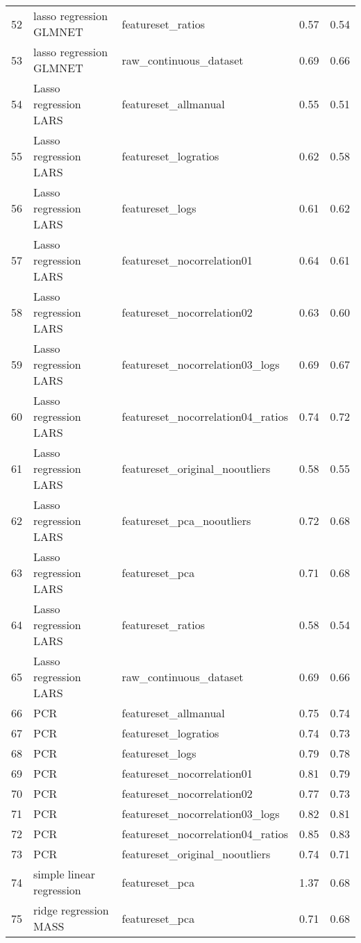 \begin{tabular}{cllcc}
  52 & lasso regression GLMNET & featureset\_ratios & 0.57 & 0.54 \\ 
  53 & lasso regression GLMNET & raw\_continuous\_dataset & 0.69 & 0.66 \\ 
  54 & Lasso regression LARS & featureset\_allmanual & 0.55 & 0.51 \\ 
  55 & Lasso regression LARS & featureset\_logratios & 0.62 & 0.58 \\ 
  56 & Lasso regression LARS & featureset\_logs & 0.61 & 0.62 \\ 
  57 & Lasso regression LARS & featureset\_nocorrelation01 & 0.64 & 0.61 \\ 
  58 & Lasso regression LARS & featureset\_nocorrelation02 & 0.63 & 0.60 \\ 
  59 & Lasso regression LARS & featureset\_nocorrelation03\_logs & 0.69 & 0.67 \\ 
  60 & Lasso regression LARS & featureset\_nocorrelation04\_ratios & 0.74 & 0.72 \\ 
  61 & Lasso regression LARS & featureset\_original\_nooutliers & 0.58 & 0.55 \\ 
  62 & Lasso regression LARS & featureset\_pca\_nooutliers & 0.72 & 0.68 \\ 
  63 & Lasso regression LARS & featureset\_pca & 0.71 & 0.68 \\ 
  64 & Lasso regression LARS & featureset\_ratios & 0.58 & 0.54 \\ 
  65 & Lasso regression LARS & raw\_continuous\_dataset & 0.69 & 0.66 \\ 
  66 & PCR & featureset\_allmanual & 0.75 & 0.74 \\ 
  67 & PCR & featureset\_logratios & 0.74 & 0.73 \\ 
  68 & PCR & featureset\_logs & 0.79 & 0.78 \\ 
  69 & PCR & featureset\_nocorrelation01 & 0.81 & 0.79 \\ 
  70 & PCR & featureset\_nocorrelation02 & 0.77 & 0.73 \\ 
  71 & PCR & featureset\_nocorrelation03\_logs & 0.82 & 0.81 \\ 
  72 & PCR & featureset\_nocorrelation04\_ratios & 0.85 & 0.83 \\ 
  73 & PCR & featureset\_original\_nooutliers & 0.74 & 0.71 \\ 
  74 & simple linear regression & featureset\_pca & 1.37 & 0.68 \\ 
  75 & ridge regression MASS & featureset\_pca & 0.71 & 0.68 \\ 

\end{tabular}
